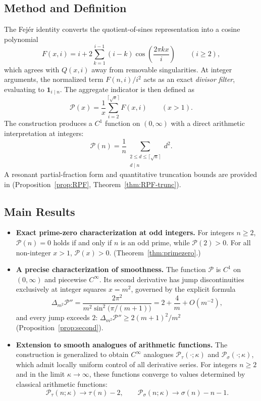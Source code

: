 \subsection*{Method and Definition}
The Fejér identity converts the quotient-of-sines representation into a cosine polynomial
\[
F(x,i)=i+2\sum_{k=1}^{i-1}(i-k)\cos\!\left(\frac{2\pi k x}{i}\right)\qquad(i\ge2),
\]
which agrees with \(Q(x,i)\) away from removable singularities. At integer arguments, the normalized term $F(n,i)/i^2$ acts as an exact \emph{divisor filter}, evaluating to $\mathbf{1}_{i\mid n}$. The aggregate indicator is then defined as
\[
\mathcal P(x)=\frac{1}{x}\sum_{i=2}^{\lceil\sqrt{x}\rceil} F(x,i)\qquad(x>1).
\]
The construction produces a \(C^1\) function on \((0,\infty)\) with a direct arithmetic interpretation at integers:
\[
\mathcal P(n)=\frac{1}{n}\sum_{\substack{2\le d\le \lceil\sqrt n\rceil\\ d\mid n}} d^2.
\]
A resonant partial-fraction form and quantitative truncation bounds are provided in (Proposition~\ref{prop:RPF}, Theorem~\ref{thm:RPF-trunc}).

\subsection*{Main Results}
\begin{itemize}
  \item \textbf{Exact prime-zero characterization at odd integers.} For integers \(n\ge2\), \(\mathcal P(n)=0\) holds if and only if $n$ is an odd prime, while \(\mathcal P(2)>0\). For all non-integer \(x>1\), \(\mathcal P(x)>0\). (Theorem~\ref{thm:primezero}.)
  \item \textbf{A precise characterization of smoothness.} The function \(\mathcal P\) is \(C^1\) on \((0,\infty)\) and piecewise \(C^\infty\). Its second derivative has jump discontinuities exclusively at integer squares \(x=m^2\), governed by the explicit formula
  \[
  \Delta_{m^{2}}\mathcal{P}''=\frac{2\pi^{2}}{m^{2}\sin^{2}\!\bigl(\pi/(m+1)\bigr)}
  =2+\frac{4}{m}+O(m^{-2}),
  \]
  and every jump exceeds $2$: $\Delta_{m^2}\mathcal P''\ge 2(m+1)^2/m^2$ (Proposition~\ref{prop:second}).
  \item \textbf{Extension to smooth analogues of arithmetic functions.} The construction is generalized to obtain \(C^\infty\) analogues \(\mathcal P_\tau(\cdot;\kappa)\) and \(\mathcal P_\sigma(\cdot;\kappa)\), which admit locally uniform control of all derivative series. For integers \(n\ge2\) and in the limit \(\kappa\to\infty\), these functions converge to values determined by classical arithmetic functions:
  \[
  \mathcal{P}_\tau(n;\kappa)\to \tau(n)-2,\qquad
  \mathcal{P}_\sigma(n;\kappa)\to \sigma(n)-n-1.
  \]
\end{itemize}

